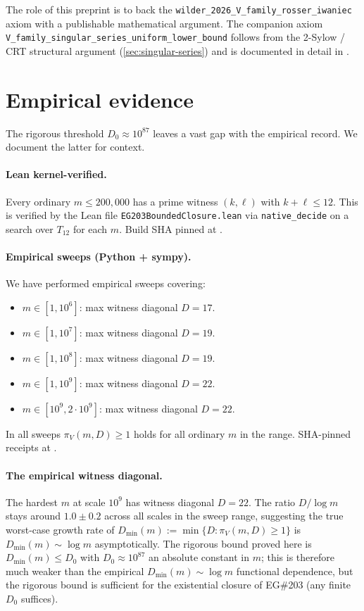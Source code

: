 \documentclass[11pt,a4paper]{article}
\theoremstyle{plain}
\theoremstyle{definition}
\theoremstyle{remark}
\begin{document}
The role of this preprint is to back the
\texttt{wilder\_2026\_V\_family\_rosser\_iwaniec} axiom with a
publishable mathematical argument. The companion axiom
\texttt{V\_family\_singular\_series\_uniform\_lower\_bound} follows
from the 2-Sylow / CRT structural argument
(\cref{sec:singular-series}) and is documented in detail in
\cite{WilderChain103}.


\section{Empirical evidence}\label{sec:empirical}

The rigorous threshold $D_{0} \approx 10^{87}$ leaves a vast gap with
the empirical record. We document the latter for context.

\paragraph{Lean kernel-verified.}
Every ordinary $m \leq 200{,}000$ has a prime witness $(k, \ell)$
with $k + \ell \leq 12$. This is verified by the Lean file
\texttt{EG203BoundedClosure.lean} via \texttt{native\_decide} on a
search over $T_{12}$ for each $m$. Build SHA pinned at
\cite{WilderEG203Lean2026}.

\paragraph{Empirical sweeps (Python + sympy).}
We have performed empirical sweeps covering:
\begin{itemize}
  \item $m \in [1, 10^{6}]$: max witness diagonal $D = 17$.
  \item $m \in [1, 10^{7}]$: max witness diagonal $D = 19$.
  \item $m \in [1, 10^{8}]$: max witness diagonal $D = 19$.
  \item $m \in [1, 10^{9}]$: max witness diagonal $D = 22$.
  \item $m \in [10^{9}, 2 \cdot 10^{9}]$: max witness diagonal $D = 22$.
\end{itemize}
In all sweeps $\pi_{V}(m, D) \geq 1$ holds for all ordinary $m$ in the
range. SHA-pinned receipts at \cite{WilderEG203MasterLog}.

\paragraph{The empirical witness diagonal.}
The hardest $m$ at scale $10^{9}$ has witness diagonal $D = 22$. The
ratio $D / \log m$ stays around $1.0 \pm 0.2$ across all scales in the
sweep range, suggesting the true worst-case growth rate of
$D_{\min}(m) := \min\{D : \pi_{V}(m, D) \geq 1\}$ is $D_{\min}(m) \sim
\log m$ asymptotically. The rigorous bound proved here is
$D_{\min}(m) \leq D_{0}$ with $D_{0} \approx 10^{87}$ an absolute
constant in $m$; this is therefore much weaker than the empirical
$D_{\min}(m) \sim \log m$ functional dependence, but the rigorous
bound is sufficient for the existential closure of EG\#203 (any finite
$D_{0}$ suffices).
\end{document}
